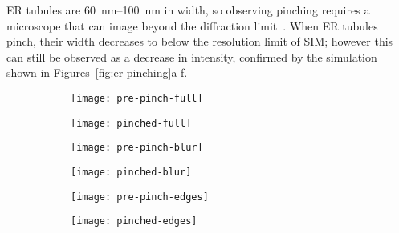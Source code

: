 ER tubules are \SIrange{60}{100}{\nano\metre} in width, so observing pinching requires a microscope that can image beyond the diffraction limit~\cite{lippincott1989rapid}.
When ER tubules pinch, their width decreases to below the resolution limit of SIM; however this can still be observed as a decrease in intensity, confirmed by the simulation shown in Figures~\ref{fig:er-pinching}a-f.

\begin{figure}[tbp]
\centering
\begin{subfigure}[b]{0.16\textwidth}
	\texttt{[image: pre-pinch-full]}
	\caption{}\label{fig:pre-pinch-full}
\end{subfigure}\hfill
\begin{subfigure}[b]{0.16\textwidth}
	\texttt{[image: pinched-full]}
	\caption{}\label{fig:pinched-full}
\end{subfigure}\hfill
\begin{subfigure}[b]{0.16\textwidth}
	\texttt{[image: pre-pinch-blur]}
	\caption{}\label{fig:pre-pinch-blur}
\end{subfigure}\hfill
\begin{subfigure}[b]{0.16\textwidth}
	\texttt{[image: pinched-blur]}
	\caption{}\label{fig:pinched-blur}
\end{subfigure}\hfill
\begin{subfigure}[b]{0.16\textwidth}
	\texttt{[image: pre-pinch-edges]}
	\caption{}\label{fig:pinched-edges}
\end{subfigure}\hfill
\begin{subfigure}[b]{0.16\textwidth}
	\texttt{[image: pinched-edges]}
	\caption{}\label{fig:pre-pinch-edges}
\end{subfigure}


\end{figure}

